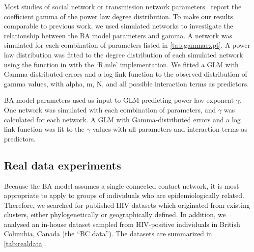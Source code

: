 Most studies of social network or transmission network
parameters~\autocite[e.g.][]{liljeros2001web, jones2003assessment,
schneeberger2004scale, brown2011transmission} report the coefficient
\gls{gamma} of the power law degree distribution. To make our results
comparable to previous work, we used simulated networks to investigate the
relationship between the \gls{BA} model parameters and \gls{gamma}. A network
was simulated for each combination of parameters listed in
\cref{tab:gammaexpt}. A power law distribution was fitted to the degree
distribution of each simulated network using the 
function in  with the `R.mle' implementation. We fitted a
\gls{GLM} with Gamma-distributed errors and a log link function to the observed
distribution of \gls{gamma} values, with \gls{alpha}, \gls{m}, \gls{N}, and all
possible interaction terms as predictors.

\begin{table}
  \centering
  
  \caption[\gls{BA} parameters used as input \gls{GLM} predicting $\gamma$]
  {
    \gls{BA} model parameters used as input to \gls{GLM} predicting power law
    exponent $\gamma$. One network was simulated with each combination of
    parameters, and $\gamma$ was calculated for each network. A \gls{GLM} with
    Gamma-distributed errors and a log link function was fit to the $\gamma$
    values with all parameters and interaction terms as predictors.
  }
  \label{tab:gammaexpt}
\end{table}

\subsection{Real data experiments}

Because the \gls{BA} model assumes a single connected contact network, it is
most appropriate to apply to groups of individuals who are epidemiologically
related. Therefore, we searched for published \gls{HIV} datasets which
originated from existing clusters, either phylogenetically or geographically
defined. In addition, we analysed an in-house dataset sampled from
\gls{HIV}-positive individuals in British Columbia, Canada (the ``BC data'').
The datasets are summarized in \cref{tab:realdata}.

